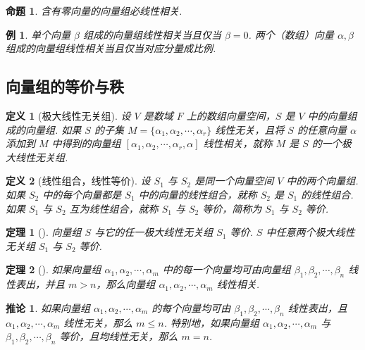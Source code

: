 \documentclass[zihao=-4,UTF8,linespread=1.8,nothm]{aytony_base}
\newtheorem{theorem}{\indent 定理}[subsection]
\newtheorem{proposition}{\indent 命题}[subsection]
\newtheorem*{corollary}{\indent 推论}
\newtheorem{definition}{\indent 定义}[subsection]
\newtheorem{example}{\indent 例}[subsection]
\begin{document}
\begin{proposition}
    含有零向量的向量组必线性相关.
\end{proposition}

\setcounter{example}{4}
\begin{example}
    单个向量 $\beta$ 组成的向量组线性相关当且仅当 $\beta = 0$. 两个（数组）向量 $\alpha, \beta$ 组成的向量组线性相关当且仅当对应分量成比例.
\end{example}

\subsection{向量组的等价与秩}

\begin{definition}[极大线性无关组]
    设 $V$ 是数域 $F$ 上的数组向量空间，$S$ 是 $V$ 中的向量组成的向量组. 如果 $S$ 的子集 $M = \{\alpha_1, \alpha_2, \cdots, \alpha_r\}$ 线性无关，且将 $S$ 的任意向量 $\alpha$ 添加到 $M$ 中得到的向量组 $[\alpha_1, \alpha_2, \cdots, \alpha_r, \alpha] $ 线性相关，就称 $M$ 是 $S$ 的一个极大线性无关组.
\end{definition}

\begin{definition}[线性组合，线性等价]
    设 $S_1$ 与 $S_2$ 是同一个向量空间 $V$ 中的两个向量组. 如果 $S_2$ 中的每个向量都是 $S_1$ 中的向量的线性组合，就称 $S_2$ 是 $S_1$ 的线性组合. 如果 $S_1$ 与 $S_2$ 互为线性组合，就称 $S_1$ 与 $S_2$ 等价，简称为 $S_1$ 与 $S_2$ 等价.
\end{definition}

\begin{theorem}[]
    向量组 $S$ 与它的任一极大线性无关组 $S_1$ 等价. $S$ 中任意两个极大线性无关组 $S_1$ 与 $S_2$ 等价.
\end{theorem}

\begin{theorem}[]
    如果向量组 $\alpha_1, \alpha_2, \cdots, \alpha_m$ 中的每一个向量均可由向量组 $\beta_1,\beta_2, \cdots, \beta_n$ 线性表出，并且 $m > n$，那么向量组 $\alpha_1, \alpha_2, \cdots, \alpha_m$ 线性相关.
\end{theorem}

\begin{corollary}
    如果向量组 $\alpha_1, \alpha_2, \cdots, \alpha_m$ 的每个向量均可由 $\beta_1, \beta_2, \cdots, \beta_n$ 线性表出，且 $\alpha_1, \alpha_2,\!\cdots,\!\alpha_m$ 线性无关，那么 $m \leqslant n$. 特别地，如果向量组 $\alpha_1, \alpha_2, \cdots, \alpha_m$ 与 $\beta_1, \beta_2, \cdots, \beta_n$ 等价，且均线性无关，那么 $m = n$.
\end{corollary}
\end{document}
